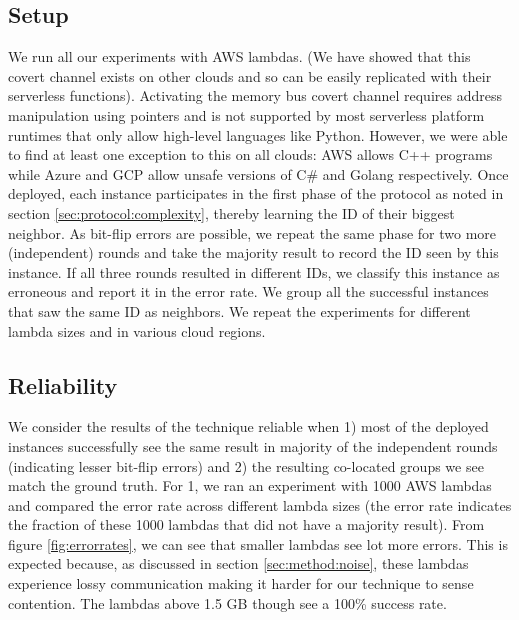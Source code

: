 \subsection{Setup}
\label{subsec:expsetup}
We run all our experiments with AWS\cite{awscloud} lambdas. (We have showed that this covert 
channel exists on other clouds and so can be easily replicated with their serverless functions).
Activating the memory bus covert channel requires address manipulation using pointers and 
is not supported by most serverless platform runtimes that only allow high-level languages like Python. 
However, we were able to find at least one exception to this on all clouds: AWS allows 
C++ programs while Azure and GCP allow unsafe versions of C\# and Golang respectively.
Once deployed, each instance participates in the first phase of the protocol
as noted in section \ref{sec:protocol:complexity}, thereby learning the ID of their 
biggest neighbor. As bit-flip errors are possible, we repeat the same phase for two 
more (independent) rounds and take the majority result to record the ID seen by this instance. 
If all three rounds resulted in different IDs, we classify this instance as erroneous 
and report it in the error rate. We group all the successful instances that saw the same ID 
as neighbors. We repeat the experiments for different lambda sizes and in various cloud regions.


\subsection{Reliability}
We consider the results of the technique reliable when 1) most of the deployed instances
successfully see the same result in majority of the independent rounds (indicating 
lesser bit-flip errors) and 2) the resulting co-located groups we see match the ground truth.
For 1, we ran an experiment with 1000 AWS lambdas and compared the error rate across 
different lambda sizes (the error rate indicates the fraction of these 1000 lambdas that 
did not have a majority result). From figure \ref{fig:errorrates}, we can see that smaller 
lambdas see lot more errors. This is expected because, as discussed in section \ref{sec:method:noise}, these lambdas experience lossy communication making it harder 
for our technique to 
sense contention. The lambdas above 1.5 GB though see a 100\% success rate.   

